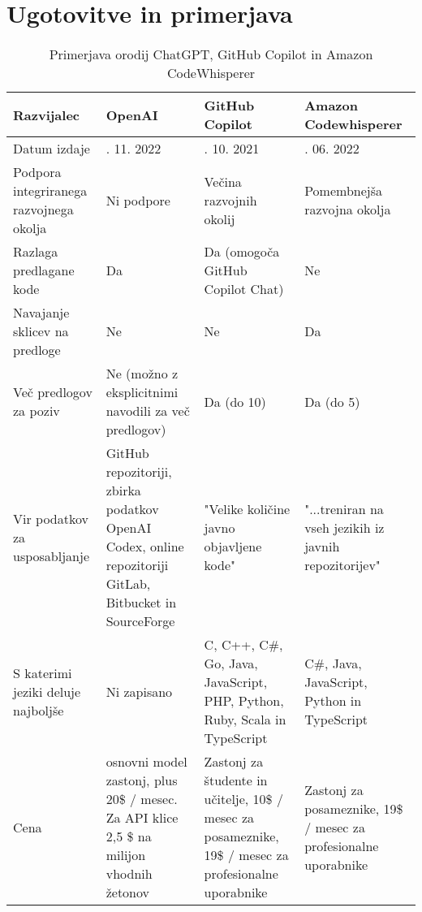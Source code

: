 \documentclass[a4paper,12pt,openright]{book}
\begin{document}
\section{Ugotovitve in primerjava}



\begin{longtable}{|>{\raggedright\arraybackslash}p{2.5cm}|>{\raggedright\arraybackslash}p{3cm}|>{\raggedright\arraybackslash}p{3.5cm}|>{\raggedright\arraybackslash}p{3cm}|}
\caption{Primerjava orodij ChatGPT, GitHub Copilot in Amazon CodeWhisperer} \label{fig:primerjava-tabela}\\
\hline
Razvijalec              & OpenAI      & GitHub Copilot                 & Amazon Codewhisperer            \\ \hline
Datum izdaje               & 30. 11. 2022        & 29. 10. 2021           & 23. 06. 2022       \\ \hline
Podpora integriranega razvojnega okolja           & Ni podpore          & Večina razvojnih okolij        & Pomembnejša razvojna okolja          \\ \hline
Razlaga predlagane kode       & Da                       & Da (omogoča GitHub Copilot Chat)                           & Ne                       \\ \hline
Navajanje sklicev na predloge                  & Ne                      & Ne                    & Da                      \\ \hline
Več predlogov za poziv                & Ne (možno z eksplicitnimi navodili za več predlogov)         & Da (do 10)                  & Da (do 5)               \\ \hline
Vir podatkov za usposabljanje             & GitHub repozitoriji, zbirka podatkov OpenAI Codex, online repozitoriji GitLab, Bitbucket in SourceForge                   & "Velike količine javno objavljene kode"                  & "...treniran na vseh jezikih iz javnih repozitorijev"                    \\ \hline
S katerimi jeziki deluje najboljše                        & Ni zapisano                  & C, C++, C\#, Go, Java, JavaScript, PHP, Python, Ruby, Scala in TypeScript              & C\#, Java, JavaScript, Python in TypeScript  \\ \hline
Cena               & osnovni model zastonj, plus 20\$ / mesec. Za API klice 2,5 \$ na milijon vhodnih žetonov           & Zastonj za študente in učitelje, 10\$ / mesec za posameznike, 19\$ / mesec za profesionalne uporabnike                    &   Zastonj za posameznike, 19\$ / mesec za profesionalne uporabnike   \\ \hline
\end{longtable}
\end{document}
